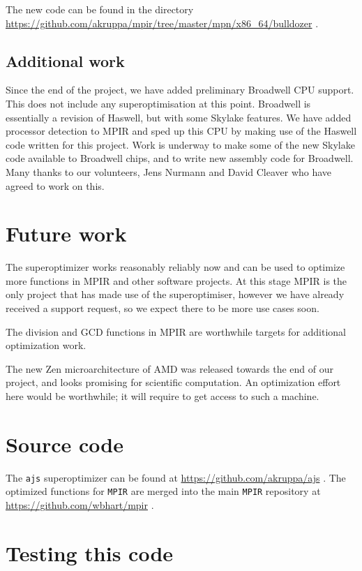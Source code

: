 The new code can be found in the directory
\url{https://github.com/akruppa/mpir/tree/master/mpn/x86_64/bulldozer} .

\subsection{Additional work}\label{additional-work}

Since the end of the project, we have added preliminary Broadwell CPU
support. This does not include any superoptimisation at this point.
Broadwell is essentially a revision of Haswell, but with some Skylake
features. We have added processor detection to MPIR and sped up this CPU
by making use of the Haswell code written for this project. Work is
underway to make some of the new Skylake code available to Broadwell
chips, and to write new assembly code for Broadwell. Many thanks to our
volunteers, Jens Nurmann and David Cleaver who have agreed to work on
this.

\section*{Future work}\label{future-work}

The superoptimizer works reasonably reliably now and can be used to
optimize more functions in MPIR and other software projects. At this
stage MPIR is the only project that has made use of the superoptimiser,
however we have already received a support request, so we expect there
to be more use cases soon.

The division and GCD functions in MPIR are worthwhile targets for
additional optimization work.

The new Zen microarchitecture of AMD was released towards the end of our
project, and looks promising for scientific computation. An optimization
effort here would be worthwhile; it will require to get access to such a
machine.

\section*{Source code}\label{source-code}

The \texttt{ajs} superoptimizer can be found at
\url{https://github.com/akruppa/ajs} . The optimized functions for
\texttt{MPIR} are merged into the main \texttt{MPIR} repository at
\url{https://github.com/wbhart/mpir} .

\section*{Testing this code}\label{testing-this-code}

